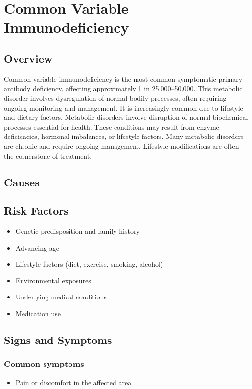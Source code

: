 \chapter{Common Variable Immunodeficiency}
\label{sec:Common Variable Immunodeficiency}

\section{Overview}
Common variable immunodeficiency is the most common symptomatic primary antibody deficiency, affecting approximately 1 in 25,000--50,000. This metabolic disorder involves dysregulation of normal bodily processes, often requiring ongoing monitoring and management. It is increasingly common due to lifestyle and dietary factors. Metabolic disorders involve disruption of normal biochemical processes essential for health. These conditions may result from enzyme deficiencies, hormonal imbalances, or lifestyle factors. Many metabolic disorders are chronic and require ongoing management. Lifestyle modifications are often the cornerstone of treatment.
\section{Causes}
\section{Risk Factors}
\begin{itemize}[noitemsep]
  \item Genetic predisposition and family history
  \item Advancing age
  \item Lifestyle factors (diet, exercise, smoking, alcohol)
  \item Environmental exposures
  \item Underlying medical conditions
  \item Medication use
\end{itemize}
\section{Signs and Symptoms}
\subsection{Common symptoms}
\begin{itemize}[noitemsep]
  \item Pain or discomfort in the affected area
  \end{itemize}
